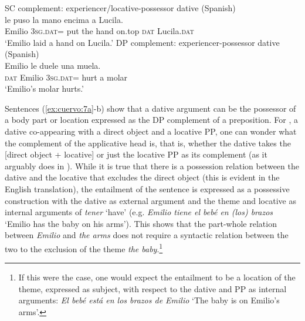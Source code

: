 \documentclass[output=paper,colorlinks,citecolor=brown,nonflat]{./langscibook}
\begin{document}
\ea%
    \label{ex:cuervo:8}
    \ea%
        \label{ex:cuervo:8a}
        SC complement: experiencer/locative-possessor dative   (Spanish)\\
         {le} {puso} {la} {mano} {encima}{\footnotemark} {a} {Lucila}.\\
        Emilio 3\textsc{sg.dat}= put   the hand on.top  \textsc{dat} Lucila.\textsc{dat}\\
        \glt ‘Emilio laid a hand on Lucila.’
    \ex%
        \label{ex:cuervo:8b}
        DP complement: experiencer-possessor dative (Spanish)\\
         {Emilio} {le} {duele} {una} {muela}.\\
        \textsc{dat} Emilio 3\textsc{sg.dat}= hurt a molar\\
        \glt ‘Emilio’s molar hurts.’
    \z
\z

Sentences (\ref{ex:cuervo:7a}-b) show that a dative argument can be the possessor of a body part or location expressed as the DP complement of a preposition. For , a dative co-appearing with a direct object and a locative PP, one can wonder what the complement of the applicative head is, that is, whether the dative takes the [direct object + locative] or just the locative PP as its complement (as it arguably does in ). While it is true that there is a possession relation between the dative and the locative that excludes the direct object (this is evident in the English translation), the entailment of the sentence is expressed as a possessive construction with the dative as external argument and the theme and locative as internal arguments of \textit{tener} ‘have’ (e.g. \textit{Emilio tiene el bebé en (los) brazos} ‘Emilio has the baby on his arms’).  This shows that the part-whole relation between \textit{Emilio} and \textit{the arms} does not require a syntactic relation between the two to the exclusion of the theme \textit{the baby}.\footnote{If this were the case, one would expect the entailment to be a location of the theme, expressed as subject, with respect to the dative and PP as internal arguments: \textit{El bebé está en los brazos de Emilio} ‘The baby is on Emilio’s arms’.}     
\end{document}
